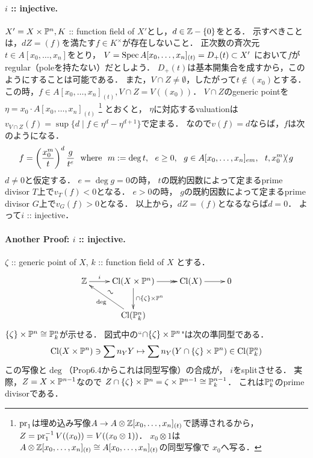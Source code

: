 \documentclass[a4paper]{jsarticle}
\newcommand{\Cl}{\operatorname{Cl}}
\begin{document}
    \paragraph{$i$ :: injective.}
    $X'=X \times \mathbb{P}^n, K$ :: function field of $X'$とし，$d \in \mathbb{Z}-\{0\}$をとる．
    示すべきことは，$dZ=(f)$を満たす$f \in K^{\times}$が存在しないこと．
    正次数の斉次元$t \in A[x_0,\dots,x_n]$をとり，
    $V=\operatorname{Spec} A[x_0,\dots,x_n]_{(t)}=D_+(t) \subset X'$
    において$f$がregular（poleを持たない）だとしよう．
    $D_+(t)$は基本開集合を成すから，このようにすることは可能である．
    また，$V \cap Z \neq \emptyset$，したがって$t \not \in (x_0)$とする．
    この時，$f \in A[x_0,\dots,x_n]_{(t)}, V \cap Z=V((x_0))$．
    $V \cap Z$のgeneric pointを$\eta=x_0 \cdot A[x_0,\dots,x_n]_{(t)}$
    \footnote
        {
            $\operatorname{pr}_1$は埋め込み写像$A \to A \otimes \mathbb{Z}[x_0,\dots,x_n]_{(t)}$で誘導されるから，
            $Z=\operatorname{pr}_1^{-1}V((x_0))=V((x_0 \otimes 1))$．
            $x_0 \otimes 1$は$A \otimes \mathbb{Z}[x_0,\dots,x_n]_{(t)} \cong A[x_0,\dots,x_n]_{(t)}$の同型写像で
            $x_0$へ写る．
        }
    とおくと，
    $\eta$に対応するvaluationは
    $v_{V \cap Z}(f)=\sup \{d \mid f \in \eta^d-\eta^{d+1} \}$で定まる．
    なので$v(f)=d$ならば，$f$は次のようになる．
    \[
        f=\left(\frac{x_0^m}{t}\right)^d \frac{g}{t^e}
        ~~\text{where}~~
        m:=\deg t,~~ e \geq 0,~~ g \in A[x_0,\dots,x_n]_{em},~~ t, x_0^m \!\!\not\!\backslash\, g
    \]
    $d \neq 0$と仮定する．
    $e=\deg g=0$の時，
    $t$の既約因数によって定まるprime divisor $T$上で$v_T(f)<0$となる．
    $e>0$の時，
    $g$の既約因数によって定まるprime divisor $G$上で$v_G(f)>0$となる．
    以上から，$dZ=(f)$となるならば$d=0$．
    よって$i$ :: injective．

    \paragraph{Another Proof: $i$ :: injective.}
    $\zeta$ :: generic point of $X$,
    $k$ :: function field of $X$
    とする．
    \[
    \xymatrix
    {
        \Z \ar[r]^-{i}& \Cl(X \times \proj^n) \ar[d]^-{\cap \{\zeta\} \times \proj^n} \ar@{->>}[r]& \Cl(X) \ar[r]& 0 \\
        {} & \ar[lu]_-{\rotatebox{150}{$\sim$}}^-{\deg} \Cl(\proj^n_{k}) & {} & {}
    }
    \]
    $\{\zeta\} \times \mathbb{P}^n \cong \mathbb{P}^n_{k}$が示せる．
    図式中の``$\cap \{\zeta\} \times \mathbb{P}^n$"は次の準同型である．
    \[
        \Cl(X \times \proj^n) \ni
        \sum n_Y Y \mapsto \sum n_Y (Y \cap \{\zeta\} \times \proj^n)
        \in \Cl(\proj^n_{k})
    \]
    この写像と$\deg$（Prop6.4からこれは同型写像）の合成が，
    $i$をsplitさせる．
    実際，$Z=X \times \mathbb{P}^{n-1}$なので
    $Z \cap \{\zeta\} \times \mathbb{P}^n=\zeta \times \mathbb{P}^{n-1} \cong \mathbb{P}^{n-1}_k$．
    これは$\mathbb{P}^n_k$のprime divisorである．
\end{document}
